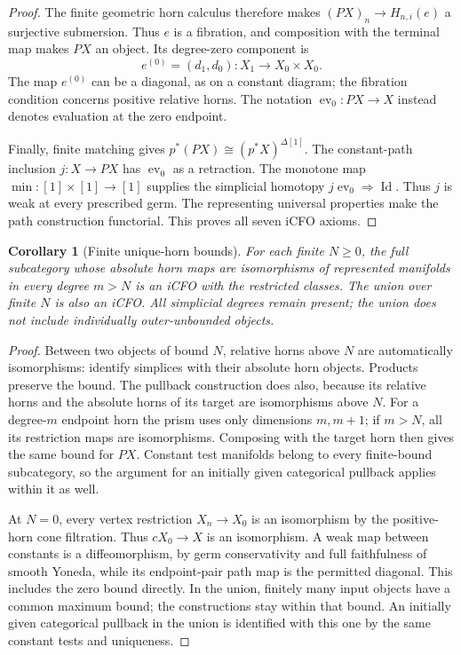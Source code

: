 \documentclass[12pt]{amsart}
\newtheorem{cor}[thm]{Corollary}
\theoremstyle{definition}
\theoremstyle{remark}
\numberwithin{equation}{section}
\DeclareMathOperator{\id}{Id}
\begin{document}
\begin{proof}
The finite geometric horn calculus therefore makes
$(PX)_n\to H_{n,i}(e)$ a surjective submersion.
Thus $e$ is a fibration, and composition with the
terminal map makes $PX$ an object. Its degree-zero
component is
\[
 e^{(0)}=(d_1,d_0):X_1\longrightarrow X_0\times X_0.
\]
The map $e^{(0)}$ can be a diagonal, as on a constant
diagram; the fibration condition concerns positive
relative horns.
The notation $\operatorname{ev}_0:PX\to X$
instead denotes evaluation at the zero endpoint.

Finally, finite matching gives
$p^*(PX)\cong(p^*X)^{\Delta[1]}$.
The constant-path inclusion $j:X\to PX$ has
$\operatorname{ev}_0$ as a retraction. The monotone map
$\min:[1]\times[1]\to[1]$ supplies the simplicial
homotopy $j\operatorname{ev}_0\Rightarrow\id$.
Thus $j$ is weak at every prescribed germ.
The representing universal properties make the path
construction functorial. This proves all seven iCFO axioms.
\end{proof}

\begin{cor}[Finite unique-horn bounds]
\label{cor:ordinary-geometric-finite}
For each finite $N\ge0$, the full subcategory whose
absolute horn maps are isomorphisms of represented
manifolds in every degree $m>N$ is an iCFO with the
restricted classes. The union over finite $N$ is
also an iCFO. All simplicial degrees remain present;
the union does not include individually outer-unbounded
objects.
\end{cor}

\begin{proof}
Between two objects of bound $N$, relative horns above
$N$ are automatically isomorphisms: identify simplices
with their absolute horn objects. Products preserve
the bound. The pullback construction does also, because
its relative horns and the absolute horns of its target
are isomorphisms above $N$. For a degree-$m$ endpoint
horn the prism uses only dimensions $m,m+1$; if $m>N$,
all its restriction maps are isomorphisms. Composing
with the target horn then gives the same bound for $PX$.
Constant test manifolds belong to every finite-bound
subcategory, so the argument for an initially given
categorical pullback applies within it as well.

At $N=0$, every vertex restriction $X_n\to X_0$ is
an isomorphism by the positive-horn cone filtration.
Thus $cX_0\to X$ is an isomorphism. A weak map between
constants is a diffeomorphism, by germ conservativity
and full faithfulness of smooth Yoneda, while its
endpoint-pair path map is the permitted diagonal.
This includes the zero bound directly.
In the union, finitely many input objects have a common
maximum bound; the constructions stay within that bound.
An initially given categorical pullback in the union
is identified with this one by the same constant tests
and uniqueness.
\end{proof}
\end{document}
